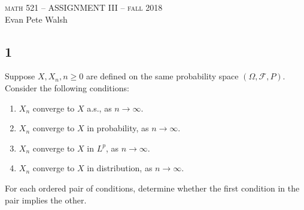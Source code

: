 \documentclass[12pt]{article}
\newcommand\toinf{\rightarrow\infty}
\begin{document}
\thispagestyle{empty}
\begin{center}
  \Large \textsc{math 521 -- ASSIGNMENT III -- fall 2018} \\ 
  \vspace{5mm}
  \large Evan Pete Walsh
\end{center}


\subsection*{1}
\begin{tcolorbox}
  Suppose $X, X_n, n\geq 0$ are defined on the same probability space $(\Omega, \mathcal{F}, P)$. Consider the following conditions:
  \begin{enumerate}[label=(\roman*)]
    \item $X_n$ converge to $X$ a.s., as $n \rightarrow \infty$.
    \item $X_n$ converge to $X$ in probability, as $n \toinf$.
    \item $X_n$ converge to $X$ in $L^p$, as $n \toinf$.
    \item $X_n$ converge to $X$ in distribution, as $n \toinf$.
  \end{enumerate}
  For each ordered pair of conditions, determine whether the first condition in the pair implies the other.
\end{tcolorbox}
\end{document}
